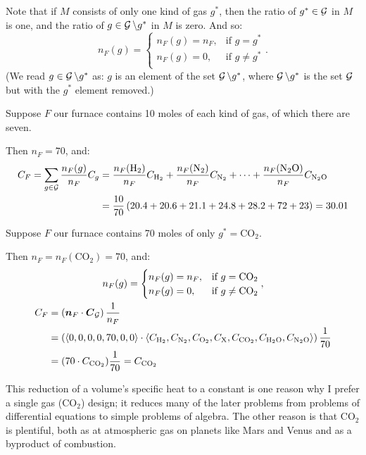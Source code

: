 \documentclass{article}
\newcommand{\Hyd}{\mathrm{H}_2}
\newcommand{\Nit}{\mathrm{N}_2}
\newcommand{\Ox}{\mathrm{O}_2}
\newcommand{\Pol}{\mathrm{X}}
\newcommand{\CDiox}{\mathrm{CO}_2}
\newcommand{\Water}{\mathrm{H}_2\mathrm{O}}
\newcommand{\NiOx}{\mathrm{N}_2\mathrm{O}}
\begin{document}
Note that if $M$ consists of only one kind of gas $g^*$, then the ratio of $g^*\in\operatorname{{\mathcal{G}}}$ in $M$ is
one, and the ratio of $g\in\operatorname{{\mathcal{G}}}\setminus g^*$ in $M$ is zero. And so:
\[
    n_F(g) = \begin{cases}
        n_F(g) = n_F, & \text{if } g = g^* \\
        n_F(g) = 0, & \text{if } g \ne g^* \\
    \end{cases}.
\]
(We read $g\in
\operatorname{{\mathcal{G}}}\setminus g^*$ as: $g$ is an element of the set $\operatorname{{\mathcal{G}}}\setminus g^*$, where $\operatorname{{\mathcal{G}}}\setminus
g^*$ is the set $\operatorname{{\mathcal{G}}}$ but with the $g^*$ element removed.)
\begin{example*}
    Suppose $F$ our furnace contains 10 moles of each kind of gas, of which there are seven.

    Then $n_F=70$, and:
    \begin{align*}
        C_F
        = \sum_{g\in\calG}\frac{n_F(g)}{n_F}C_g
        &= \frac{n_F(\Hyd)}{n_F}C_{\Hyd}+\frac{n_F(\Nit)}{n_F}C_{\Nit}+\cdots+\frac{n_F(\NiOx)}{n_F}C_{\NiOx} \\
        &= \frac{10}{70}\left(20.4 + 20.6 + 21.1 + 24.8 + 28.2 + 72 + 23\right)
        = 30.01
    \end{align*}
\end{example*}
\begin{example*}
    Suppose $F$ our furnace contains 70 moles of only $g^*=\CDiox$.

    Then $n_F=n_F(\CDiox)=70$, and:
    \begin{gather*}
        n_F(g) = \begin{cases}
            n_F(g) = n_F, & \text{if } g = \CDiox \\
            n_F(g) = 0, & \text{if } g \ne \CDiox \\
        \end{cases}, \\
        \begin{aligned}
            C_F
            &= \left(\vec{n}_F \cdot \vec{C}_{\calG}\right)\frac{1}{n_F} \\
            &=
            \left(\angvec{0,0,0,0,70,0,0}
            \cdot
            \angvec{C_{\Hyd},C_{\Nit},C_{\Ox},C_{\Pol},C_{\CDiox},C_{\Water},C_{\NiOx}}\right)
            \frac{1}{70}
            \\
            &= (70\cdot C_{\CDiox})\frac{1}{70} = C_{\CDiox}
        \end{aligned}
    \end{gather*}
\end{example*}
This reduction of a volume's specific heat to a constant is one reason why I prefer a single gas
($\CDiox$) design; it reduces many of the later problems from problems of differential equations to
simple problems of algebra. The other reason is that $\CDiox$ is plentiful, both as at atmospheric
gas on planets like Mars and Venus and as a byproduct of combustion.
\end{document}
